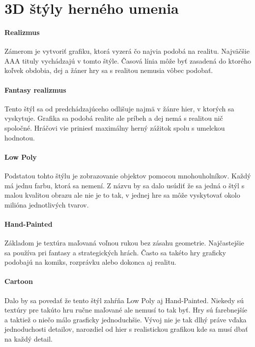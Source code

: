 \documentclass[10pt,twoside,slovak,a4paper]{article}
\begin{document}
\section{3D štýly herného umenia}

\paragraph{Realizmus}
Zámerom je vytvoriť grafiku, ktorá vyzerá čo najvia podobá na realitu. Najväčšie AAA tituly vychádzajú v tomto štýle. Časová línia môže byť zasadená do ktorého koľvek obdobia, dej a žáner hry sa s realitou nemusia vôbec podobať. 


\paragraph{Fantasy realizmus}
Tento štýl sa od predchádzajúceho odlišuje najmä v žánre hier, v ktorých sa vyskytuje. Grafika sa podobá realite ale príbeh a dej nemá s realitou nič spoločné. Hráčovi vie priniesť maximálny herný zážitok spolu s umelckou hodnotou.


\paragraph{Low Poly}
Podstatou tohto štýlu je zobrazovanie objektov pomocou mnohouholníkov. Každý má jednu farbu, ktorá sa nemení. Z názvu by sa dalo usúdiť že sa jedná o štýl s malou kvalitou obrazu ale nie je to tak, v jednej hre sa môže vyskytovať okolo milióna jednotlivých tvarov.


\paragraph{Hand-Painted}
Základom je textúra maľovaná voľnou rukou bez zásahu geometrie. Najčastejšie sa používa pri fantasy a strategických hrách. Často sa takéto hry graficky podobajú na komiks, rozprávku alebo dokonca aj realitu.

\paragraph{Cartoon}
Dalo by sa povedať že tento štýl zahŕňa Low Poly aj Hand-Painted. Niekedy sú textúry pre takúto hru ručne maľované ale nemusí to tak byť. Hry sú farebnejšíe a taktiež o niečo málo grasficky jednoduchšie. Vývoj nie je tak dlhý práve vďaka jednoduchosti detailov, narozdiel od hier s realistickou grafikou kde sa musí dbať na každý detail.
\end{document}
